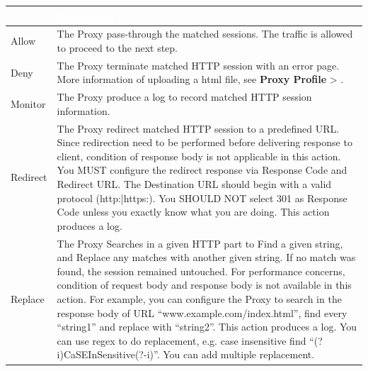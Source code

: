\begin{longtable}{p{}|p{}}   
    \rowcolor{black}\multicolumn{1}{l!{\color{white}\vrule width 0.5pt}}{\textcolor{white}{Action}}  & \textcolor{white}{Description} \\\hline                                                                                                                                                          
    Allow & The Proxy pass-through the matched sessions. The traffic is allowed to proceed to the next step.\\ \hline                                                                                                            
    Deny & The Proxy terminate matched HTTP session with an error page. More information of uploading a html file, see \textbf{Proxy Profile} > \textbf{\hyperlink{link:Response Pages}{\color{linkblue}{Response Pages}}}.\\ \hline                                                                                                           
    Monitor &  The Proxy produce a log to record matched HTTP session information.\\\hline 
    Redirect &  The Proxy redirect matched HTTP session to a predefined URL. Since redirection
                need to be performed before delivering response to client, condition of response body is not
                applicable in this action. You MUST configure the redirect response via Response Code and Redirect
                URL. The Destination URL should begin with a valid protocol (http:|https:). You SHOULD NOT select
                301 as Response Code unless you exactly know what you are doing. This action produces a log. \\ \hline 
    Replace &  The Proxy Searches in a given HTTP part to Find a given string, and Replace any matches with another given string. If no match was found, the session remained untouched. For performance concerns, condition of request body and response body is not available in this action. For example, you can configure the Proxy to search in the response body of URL “www.example.com/index.html”, find every “string1” and replace with “string2”. This action produces a log. You can use regex to do replacement, e.g. case insensitive find “(?i)CaSEInSensitive(?-i)”. You can add multiple replacement.



\end{longtable}
